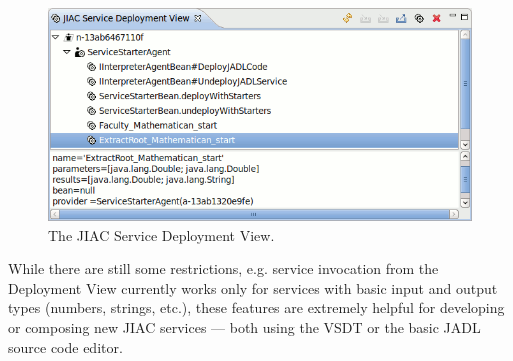\begin{figure}[ht]
	\centering
	\includegraphics[width=.5\textwidth]{figures/features/deployment-view.png}
	\caption{The JIAC Service Deployment View.}
	\label{fig:deployView}
\end{figure}

While there are still some restrictions, e.g. service invocation from the
Deployment View currently works only for services with basic input and output
types (numbers, strings, etc.), these features are extremely helpful for developing
or composing new JIAC services --- both using the VSDT or the basic JADL source
code editor.

